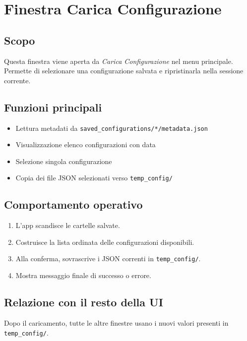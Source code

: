 \chapter{Finestra Carica Configurazione}
\label{chap:carica-config}

\section{Scopo}
Questa finestra viene aperta da \emph{Carica Configurazione} nel menu principale.
Permette di selezionare una configurazione salvata e ripristinarla nella sessione corrente.

\section{Funzioni principali}
\begin{itemize}[leftmargin=1.5em]
  \item Lettura metadati da \texttt{saved\_configurations/*/metadata.json}
  \item Visualizzazione elenco configurazioni con data
  \item Selezione singola configurazione
  \item Copia dei file JSON selezionati verso \texttt{temp\_config/}
\end{itemize}

\section{Comportamento operativo}
\begin{enumerate}[leftmargin=1.8em]
  \item L'app scandisce le cartelle salvate.
  \item Costruisce la lista ordinata delle configurazioni disponibili.
  \item Alla conferma, sovrascrive i JSON correnti in \texttt{temp\_config/}.
  \item Mostra messaggio finale di successo o errore.
\end{enumerate}

\section{Relazione con il resto della UI}
Dopo il caricamento, tutte le altre finestre usano i nuovi valori presenti in \texttt{temp\_config/}.
